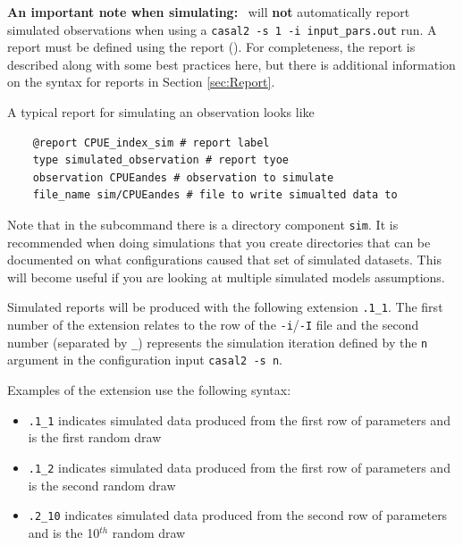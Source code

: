 \textbf{An important note when simulating:} \CNAME\ will \textbf{not} automatically report simulated observations when using a \texttt{casal2 -s 1 -i input\_pars.out} run. A report must be defined using the  report (). For completeness, the report is described along with some best practices here, but there is additional information on the syntax for reports in Section \ref{sec:Report}.

A typical report for simulating an observation looks like
\begin{verbatim}
	@report CPUE_index_sim # report label
	type simulated_observation # report tyoe
	observation CPUEandes # observation to simulate
	file_name sim/CPUEandes # file to write simualted data to
\end{verbatim}
%
Note that in the subcommand  there is a directory component \texttt{sim}. It is recommended when doing simulations that you create directories that can be documented on what configurations caused that set of simulated datasets. This will become useful if you are looking at multiple simulated models assumptions.

Simulated reports will be produced with the following extension \texttt{.1\_1}. The first number of the extension relates to the row of the \texttt{-i}/\texttt{-I} file and the second number (separated by \texttt{\_}) represents the simulation iteration defined by the \texttt{n} argument in the configuration input \texttt{casal2 -s n}. 

Examples of the extension use the following syntax:

\begin{itemize}
	\item \texttt{.1\_1} indicates simulated data produced from the first row of parameters and is the first random draw
	\item \texttt{.1\_2} indicates simulated data produced from the first row of parameters and is the second random draw
	\item \texttt{.2\_10} indicates simulated data produced from the second row of parameters and is the 10\(^{th}\) random draw
\end{itemize}


